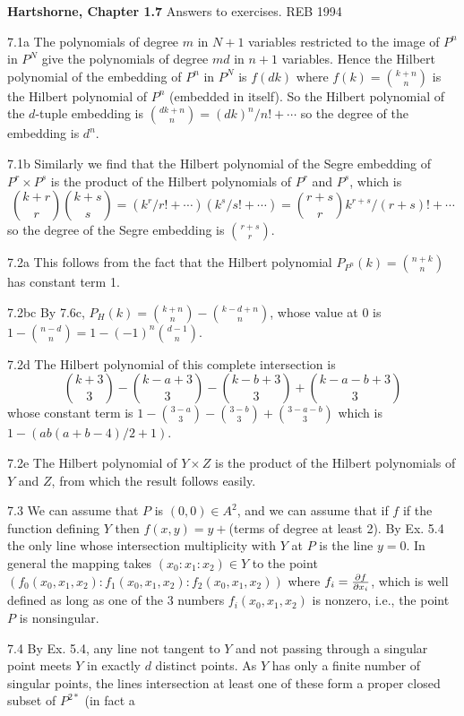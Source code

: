 \def\Z{{\bf Z}}
{\bf Hartshorne, Chapter 1.7}
Answers to exercises. \hfill REB 1994
\item{7.1a} The polynomials of degree $m$ in $N+1$ variables 
restricted to the image of $P^n$ in $P^N$ give
the polynomials of degree $md$ in $n+1$ variables. Hence
the Hilbert polynomial of the embedding of $P^n$ in $P^N$
is $f(dk)$ where $f(k)={k+n\choose n}$ is the Hilbert polynomial 
of $P^n$ (embedded in itself). So the Hilbert
polynomial of the $d$-tuple embedding is ${dk+n\choose n}=(dk)^n/n!+\cdots$
so the degree of the embedding is $d^n$.
\item{7.1b} Similarly we find that the Hilbert polynomial of
the Segre embedding of $P^r\times P^s$ is the product of the Hilbert
polynomials of $P^r$ and $P^s$, which is $${k+r\choose r}{k+s\choose s}
= (k^r/r!+\cdots)(k^s/s!+\cdots) = {r+s\choose r}k^{r+s}/(r+s)!+\cdots$$
so the degree of the Segre embedding is ${r+s\choose r}$. 
\item{7.2a} This follows from the fact that the Hilbert polynomial
$P_{P^n}(k)={n+k\choose n}$ has constant term 1. 
\item{7.2bc} By 7.6c, $P_H(k) = {k+n\choose n} -{k-d+n\choose n}$, 
whose value at 0 is $1-{n-d\choose n}= 1-(-1)^{n} {d-1\choose n}$.
\item{7.2d} The Hilbert polynomial of this complete intersection is
$${k+3\choose 3} -{k-a+3\choose 3}-{k-b+3\choose 3} + {k-a-b+3\choose 3}$$
whose constant term is $1-{3-a\choose 3}-{3-b\choose 3}+{3-a-b\choose 3}$
which is $1-(ab(a+b-4)/2+1)$. 
\item{7.2e} The Hilbert polynomial of $Y\times Z$ is the product of
the Hilbert polynomials of $Y$ and $Z$, from which the result
follows easily. 
\item{7.3} We can assume that $P$ is $(0,0)\in A^2$, and we can assume
that if $f$ if the function defining $Y$ then $f(x,y)=y+$(terms 
of degree at least 2). By Ex. 5.4 the only line whose intersection
multiplicity with $Y$ at $P$ is the line $y=0$. 
In general the mapping takes $(x_0:x_1:x_2)\in Y$ to
the point $(f_0(x_0,x_1,x_2):f_1(x_0,x_1,x_2):f_2(x_0,x_1,x_2))$
where $f_i={\partial f\over\partial x_i}$, which is well defined
as long as one of the 3 numbers $f_i(x_0,x_1,x_2)$ is nonzero,
i.e., the point $P$ is nonsingular. 
\item{7.4} By Ex. 5.4, any line not tangent to $Y$ and not passing through
a singular point meets $Y$ in exactly $d$ distinct points.  As $Y$ has
only a finite number of singular points, the lines intersection at
least one of these form a proper closed subset of $P^{2*}$ (in fact a
